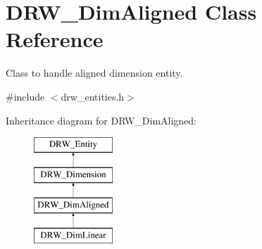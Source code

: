 \hypertarget{classDRW__DimAligned}{\section{D\-R\-W\-\_\-\-Dim\-Aligned Class Reference}
\label{classDRW__DimAligned}
}


Class to handle aligned dimension entity.  




{\ttfamily \#include $<$drw\-\_\-entities.\-h$>$}

Inheritance diagram for D\-R\-W\-\_\-\-Dim\-Aligned\-:\begin{figure}[H]
\begin{center}
\leavevmode
\includegraphics[height=4.000000cm]{classDRW__DimAligned}
\end{center}
\end{figure}
